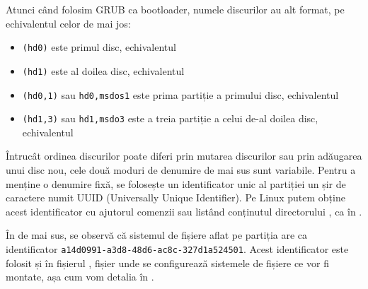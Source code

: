 Atunci când folosim GRUB ca bootloader, numele discurilor au alt format, pe echivalentul celor de mai jos:

\begin{itemize}
  \item \texttt{(hd0)} este primul disc, echivalentul 
  \item \texttt{(hd1)} este al doilea disc, echivalentul 
  \item \texttt{(hd0,1)} sau \texttt{hd0,msdos1} este prima partiție a primului disc, echivalentul 
  \item \texttt{(hd1,3)} sau \texttt{hd1,msdo3} este a treia partiție a celui de-al doilea disc, echivalentul 
\end{itemize}

Întrucât ordinea discurilor poate diferi prin mutarea discurilor sau prin adăugarea unui disc nou, cele două moduri de denumire de mai sus sunt variabile.
 Pentru a menține o denumire fixă, se folosește un identificator unic al partiției un șir de caractere numit UUID  (Universally Unique Identifier).
Pe Linux putem obține acest identificator cu ajutorul comenzii  sau listând conținutul directorului , ca în .


În  de mai sus, se observă că sistemul de fișiere aflat pe partiția  are ca identificator \texttt{a14d0991-a3d8-48d6-ac8c-327d1a524501}.
Acest identificator este folosit și în fișierul , fișier unde se configurează sistemele de fișiere ce vor fi montate, așa cum vom detalia în .

